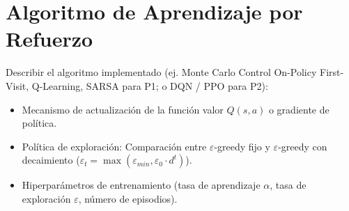 \section{Algoritmo de Aprendizaje por Refuerzo}
Describir el algoritmo implementado (ej. Monte Carlo Control On-Policy First-Visit, Q-Learning, SARSA para P1; o DQN / PPO para P2):
\begin{itemize}
    \item Mecanismo de actualización de la función valor $Q(s, a)$ o gradiente de política.
    \item Política de exploración: Comparación entre $\varepsilon$-greedy fijo y $\varepsilon$-greedy con decaimiento ($\varepsilon_t = \max(\varepsilon_{min}, \varepsilon_0 \cdot d^t)$).
    \item Hiperparámetros de entrenamiento (tasa de aprendizaje $\alpha$, tasa de exploración $\varepsilon$, número de episodios).
\end{itemize}